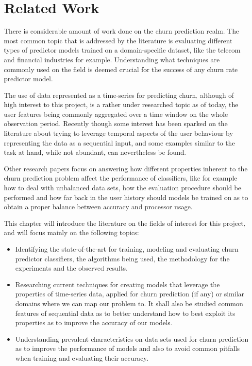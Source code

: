 \documentclass{kththesis}
\begin{document}


\chapter{Related Work}

There is considerable amount of work done on the churn prediction realm. The most common topic that is addressed by the literature is evaluating different types of predictor models trained on a domain-specific dataset, like the telecom and financial industries for example. Understanding what techniques are commonly used on the field is deemed crucial for the success of any churn rate predictor model.

The use of data represented as a time-series for predicting churn, although of high interest to this project, is a rather under researched topic as of today, the user features being commonly aggregated over a time window on the whole observation period. Recently though some interest has been sparked on the literature about trying to leverage temporal aspects of the user behaviour by representing the data as a sequential input, and some examples similar to the task at hand, while not abundant, can nevertheless be found. 

Other research papers focus on answering how different properties inherent to the churn prediction problem affect the performance of classifiers, like for example how to deal with unbalanced data sets, how the evaluation procedure should be performed and how far back in the user history should models be trained on as to obtain a proper balance between accuracy and processor usage.  

This chapter will introduce the literature on the fields of interest for this project, and will focus mainly on the following topics:

\begin{itemize}
\item Identifying the state-of-the-art for training, modeling and evaluating churn predictor classifiers, the algorithms being used, the methodology for the experiments and the observed results.

\item Researching current techniques for creating models that leverage the properties of time-series data, applied for churn prediction (if any) or similar domains where we can map our problem to. It shall also be studied common features of sequential data as to better understand how to best exploit its properties as to improve the accuracy of our models.

\item Understanding prevalent characteristics on data sets used for churn prediction as to improve the performance of models and also to avoid common pitfalls when training and evaluating their accuracy.
 
\end{itemize}
\end{document}
